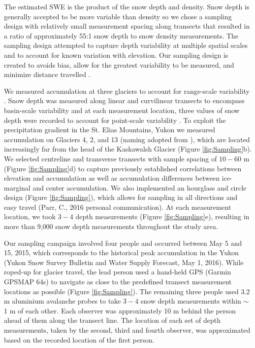 \documentclass[twocolumn,letterpaper]{igs}
\begin{document}
The estimated SWE is the product of the snow depth and density. Snow depth is generally accepted to be more variable than density \citep{Elder1991, Clark2011, Lopez2013} so we chose a sampling design with relatively small measurement spacing along transects that resulted in a ratio of approximately 55:1 snow depth to snow density measurements. The sampling design attempted to capture depth variability at multiple spatial scales and to account for known variation with elevation. Our sampling design is created to avoids bias, allow for the greatest variability to be measured, and minimize distance travelled \citep{Shea2010}.

We measured accumulation at three glaciers to account for range-scale variability \citep{Clark2011}. Snow depth was measured along linear and curvilinear transects to encompass basin-scale variability and at each measurement location, three values of snow depth were recorded to account for point-scale variability \citep{Clark2011}. To exploit the precipitation gradient in the St. Elias Mountains, Yukon \citep{Taylor1969} we measured accumulation on Glaciers 4, 2, and 13 (naming adopted from \cite{Crompton2016}), which are located increasingly far from the head of the Kaskawalsh Glacier (Figure \ref{fig:Sampling}b). We selected centreline and transverse transects with sample spacing of $10-60$ m (Figure \ref{fig:Sampling}d) to capture previously established correlations between elevation and accumulation \citep[e.g.][]{Machguth2006,Walmsley2015} as well as accumulation differences between ice-marginal and center accumulation. We also implemented an hourglass and circle design (Figure \ref{fig:Sampling}), which allows for sampling in all directions and easy travel (Parr, C., 2016 personal communication). At each measurement location, we took $3-4$ depth measurements (Figure \ref{fig:Sampling}e), resulting in more than 9,000 snow depth measurements throughout the study area. 

Our sampling campaign involved four people and occurred between May 5 and 15, 2015, which corresponds to the historical peak accumulation in the Yukon (Yukon Snow Survey Bulletin and Water Supply Forecast, May 1, 2016). While roped-up for glacier travel, the lead person used a hand-held GPS (Garmin GPSMAP 64s) to navigate as close to the predefined transect measurement locations as possible (Figure \ref{fig:Sampling}). The remaining three people used 3.2 m aluminium avalanche probes to take $3-4$ snow depth measurements within $\sim$1 m of each other. Each observer was approximately 10 m behind the person ahead of them along the transect line. The location of each set of depth measurements, taken by the second, third and fourth observer, was approximated based on the recorded location of the first person. 
\end{document}
